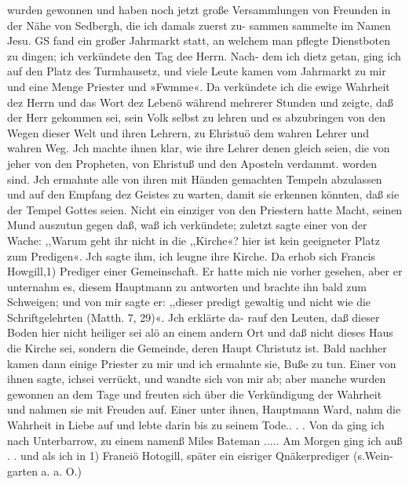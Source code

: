 
wurden gewonnen und haben noch jetzt große Versammlungen von
Freunden in der Nähe von Sedbergh, die ich damals zuerst zu-
sammen sammelte im Namen Jesu.
GS fand ein großer Jahrmarkt statt, an welchem man pflegte
Dienstboten zu dingen; ich verkündete den Tag dee Herrn. Nach-
dem ich dietz getan, ging ich auf den Platz des Turmhausetz, und
viele Leute kamen vom Jahrmarkt zu mir und eine Menge Priester
und »Fwmme«. Da verkündete ich die ewige Wahrheit dez
Herrn und das Wort dez Lebenö während mehrerer Stunden
und zeigte, daß der Herr gekommen sei, sein Volk selbst zu lehren
und es abzubringen von den Wegen dieser Welt und ihren Lehrern,
zu Ehristuö dem wahren Lehrer und wahren Weg. Jch machte
ihnen klar, wie ihre Lehrer denen gleich seien, die von jeher
von den Propheten, von Ehristuß und den Aposteln verdammt.
worden sind. Jch ermahnte alle von ihren mit Händen gemachten
Tempeln abzulassen und auf den Empfang dez Geistes zu warten,
damit sie erkennen könnten, daß sie der Tempel Gottes seien.
Nicht ein einziger von den Priestern hatte Macht, seinen Mund
auszutun gegen daß, waß ich verkündete; zuletzt sagte einer von
der Wache: ,,Warum geht ihr nicht in die ,,Kirche«? hier ist
kein geeigneter Platz zum Predigen«. Jch sagte ihm, ich leugne
ihre Kirche. Da erhob sich Francis Howgill,1) Prediger einer
Gemeinschaft. Er hatte mich nie vorher gesehen, aber er unternahm
es, diesem Hauptmann zu antworten und brachte ihn bald zum
Schweigen; und von mir sagte er: ,,dieser predigt gewaltig und
nicht wie die Schriftgelehrten (Matth. 7, 29)«. Jch erklärte da-
rauf den Leuten, daß dieser Boden hier nicht heiliger sei alö an
einem andern Ort und daß nicht dieses Haus die Kirche sei,
sondern die Gemeinde, deren Haupt Christutz ist. Bald nachher
kamen dann einige Priester zu mir und ich ermahnte sie, Buße zu
tun. Einer von ihnen sagte, ichsei verrückt, und wandte sich von
mir ab; aber manche wurden gewonnen an dem Tage und freuten
sich über die Verkündigung der Wahrheit und nahmen sie mit
Freuden auf. Einer unter ihnen, Hauptmann Ward, nahm die
Wahrheit in Liebe auf und lebte darin bis zu seinem Tode.. . .
Von da ging ich nach Unterbarrow, zu einem namenß Miles
Bateman ..... Am Morgen ging ich auß . . und als ich in
1) Franeiö Hotogill, später ein eisriger Qnäkerprediger (s.Wein-
garten a. a. O.)


